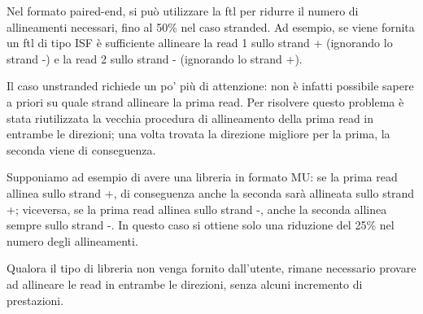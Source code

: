 Nel formato paired-end, si può utilizzare la ftl per ridurre il numero di allineamenti necessari, fino al 50\% nel caso stranded. Ad esempio, se viene fornita un ftl di tipo ISF è sufficiente allineare la read 1 sullo strand + (ignorando lo strand -) e la read 2 sullo strand - (ignorando lo strand +).

Il caso unstranded richiede un po' più di attenzione: non è infatti possibile sapere a priori su quale strand allineare la prima read. Per risolvere questo problema è stata riutilizzata la vecchia procedura di allineamento della prima read in entrambe le direzioni; una volta trovata la direzione migliore per la prima, la seconda viene di conseguenza. 

Supponiamo ad esempio di avere una libreria in formato MU: se la prima read allinea sullo strand +, di conseguenza anche la seconda sarà allineata sullo strand +; viceversa, se la prima read allinea sullo strand -, anche la seconda allinea sempre sullo strand -. In questo caso si ottiene solo una riduzione del 25\% nel numero degli allineamenti.

Qualora il tipo di libreria non venga fornito dall'utente, rimane necessario provare ad allineare le read in entrambe le direzioni, senza alcuni incremento di prestazioni.


